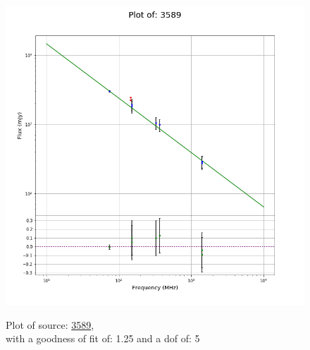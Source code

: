 \documentclass{article}
\begin{document}
\begin{figure}[H]
    \centering
    \begin{minipage}{.5\textwidth}
        \centering
        \includegraphics[scale = 0.35]{KmeulenSimSource_1hr/1hr3589.png}
        \captionsetup{labelformat=empty}
        \caption{Plot of source: \href{http://banana.transientskp.org/r4/vlo_KmeulenSimSource/runningcatalog/3589}{3589},\\with a goodness of fit of: 1.25 and a dof of: 5}
        \addtocounter{figure}{-1}
        \label{KmeulenSimSource:1hr:3589:plot}
    \end{minipage}%
    \begin{minipage}{0.5\textwidth}
        \centering


\end{minipage}
\end{figure}
\end{document}
